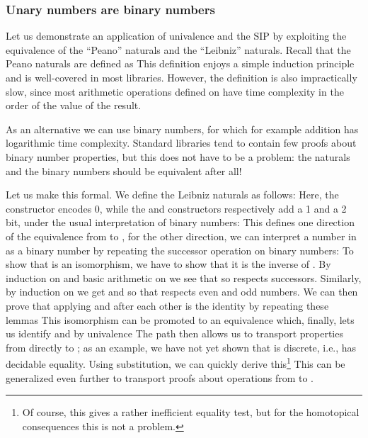\subsubsection{Unary numbers are binary numbers}\label{ssec:binary}
Let us demonstrate an application of univalence and the SIP by exploiting the equivalence of the ``Peano'' naturals and the ``Leibniz'' naturals. Recall that the Peano naturals are defined as 
This definition enjoys a simple induction principle and is well-covered in most libraries. However, the definition is also impractically slow, since most arithmetic operations defined on \bN{} have time complexity in the order of the value of the result.

As an alternative we can use binary numbers, for which for example addition has logarithmic time complexity. Standard libraries tend to contain few proofs about binary number properties, but this does not have to be a problem: the \bN{} naturals and the binary numbers should be equivalent after all!

Let us make this formal. We define the Leibniz naturals as follows:
Here, the  constructor encodes 0, while the  and  constructors respectively add a 1 and a 2 bit, under the usual interpretation of binary numbers:
This defines one direction of the equivalence from \bN{} to \bL{}, for the other direction, we can interpret a number in \bN{} as a binary number by repeating the successor operation on binary numbers:
To show that  is an isomorphism, we have to show that it is the inverse of . By induction on \bL{} and basic arithmetic on \bN{} we see that
so  respects successors. Similarly, by induction on \bN{} we get
and %
so that  respects even and odd numbers. We can then prove that applying  and  after each other is the identity by repeating these lemmas
This isomorphism can be promoted to an equivalence
which, finally, lets us identify \bN{} and \bL{} by univalence
The path  then allows us to transport properties from \bN{} directly to \bL{}; as an example, we have not yet shown that \bL{} is discrete, i.e., has decidable equality. Using substitution, we can quickly derive this\footnote{Of course, this gives a rather inefficient equality test, but for the homotopical consequences this is not a problem.}
This can be generalized even further to transport proofs about operations from \bN{} to \bL{}.

